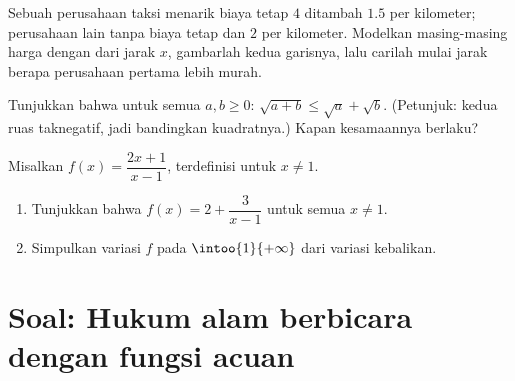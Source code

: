 \begin{exercise}[$\star\star$]\label{exo:g10:reffunc:8}
Sebuah perusahaan taksi menarik biaya tetap $4$ ditambah $1.5$ per kilometer;
perusahaan lain tanpa biaya tetap dan $2$ per kilometer. Modelkan masing-masing
harga dengan  dari jarak $x$, gambarlah kedua garisnya, lalu carilah
mulai jarak berapa perusahaan pertama lebih murah.
\end{exercise}

\begin{exercise}[$\star\star$]\label{exo:g10:reffunc:9}
Tunjukkan bahwa untuk semua $a, b \geq 0$: $\sqrt{a + b} \leq \sqrt a + \sqrt b$.
(Petunjuk: kedua ruas taknegatif, jadi bandingkan kuadratnya.) Kapan
kesamaannya berlaku?
\end{exercise}

\begin{exercise}[$\star\star\star$]\label{exo:g10:reffunc:10}
Misalkan $f(x) = \dfrac{2x + 1}{x - 1}$, terdefinisi untuk $x \neq 1$.
\begin{enumerate}
  \item Tunjukkan bahwa $f(x) = 2 + \dfrac{3}{x - 1}$ untuk semua $x \neq 1$.
  \item Simpulkan variasi $f$ pada $\intoo{1}{+\infty}$ dari variasi
         kebalikan.
\end{enumerate}
\end{exercise}

\section{Soal: Hukum alam berbicara dengan fungsi acuan}

